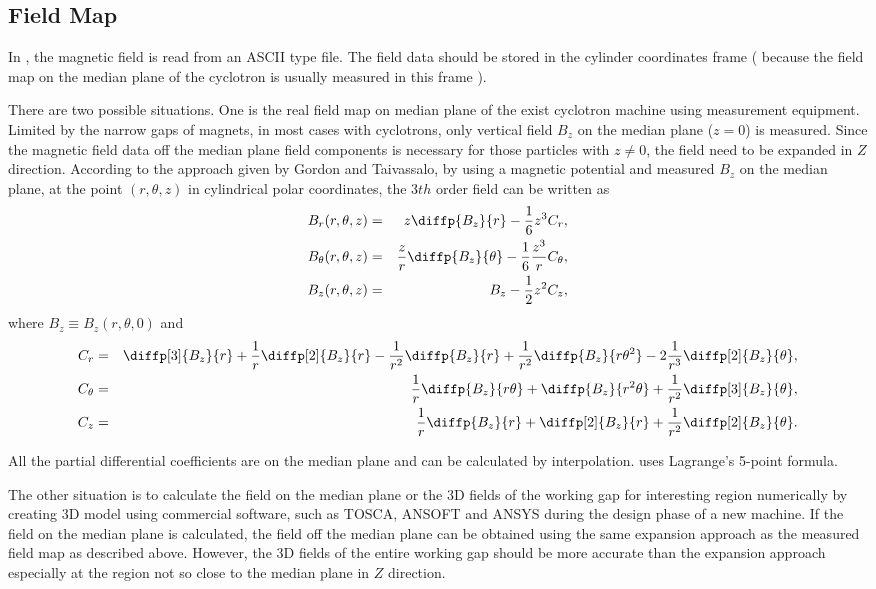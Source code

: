 \subsection{Field Map}
In \opalcycl, the magnetic field is read from an ASCII type file. The field data should be stored in the cylinder coordinates frame
( because the field map on the median plane of the cyclotron is usually measured in this frame ).

There are two possible situations. One is the real field map on median plane of the exist cyclotron machine using measurement equipment.
Limited by the narrow gaps of magnets, in most cases with cyclotrons, only vertical field $B_z$ on the median plane ($z=0$) is measured.
Since the magnetic field data off the median plane field components is necessary for those particles with $z \neq 0$, the field need to be expanded in $Z$ direction.
According to the approach given by Gordon and Taivassalo, by using a magnetic potential and measured $B_z$ on the median plane,
at the point $(r,\theta, z)$ in cylindrical polar coordinates, the 3$th$ order field can be written as
\begin{eqnarray}\label{eq:Bfield}
  B_r(r,\theta, z) & = & z\diffp{B_z}{r}-\frac{1}{6}z^3 C_r, \nonumber\\
  B_\theta(r,\theta, z) & = & \frac{z}{r}\diffp{B_z}{\theta}-\frac{1}{6}\frac{z^3}{r} C_{\theta}, \\
  B_z(r,\theta, z) & = & B_z-\frac{1}{2}z^2 C_z,  \nonumber
\end{eqnarray}
where $B_z\equiv B_z(r, \theta, 0)$ and
\begin{eqnarray}\label{eq:Bcoeff}
  C_r & = & \diffp[3]{B_z}{r} + \frac{1}{r}\diffp[2]{B_z}{r} - \frac{1}{r^2}\diffp{B_z}{r}
        + \frac{1}{r^2}\diffp{B_z}{{r}{\theta^2}} - 2\frac{1}{r^3}\diffp[2]{B_z}{\theta}, \nonumber  \\
  C_{\theta} & = & \frac{1}{r}\diffp{B_z}{{r}{\theta}} + \diffp{B_z}{{r^2}{\theta}}
        + \frac{1}{r^2}\diffp[3]{B_z}{\theta},  \\
  C_z & = & \frac{1}{r}\diffp{B_z}{r} + \diffp[2]{B_z}{r} + \frac{1}{r^2}\diffp[2]{B_z}{\theta}. \nonumber
\end{eqnarray}

All the partial differential coefficients are on the median plane and can be calculated by interpolation. \opalcycl uses  Lagrange's  5-point formula.

The other situation is to calculate the field on the median plane or the 3D fields of the working gap for interesting region numerically by creating 3D model using commercial software,
such as TOSCA, ANSOFT and ANSYS during the design phase of a new machine. If the field on the median plane is calculated, the field off the median plane can be obtained using
the same expansion approach as the measured field map as described above. However, the 3D fields of the entire working gap should be more accurate than
the expansion approach  especially at the region not so close to the median plane in $Z$ direction.

